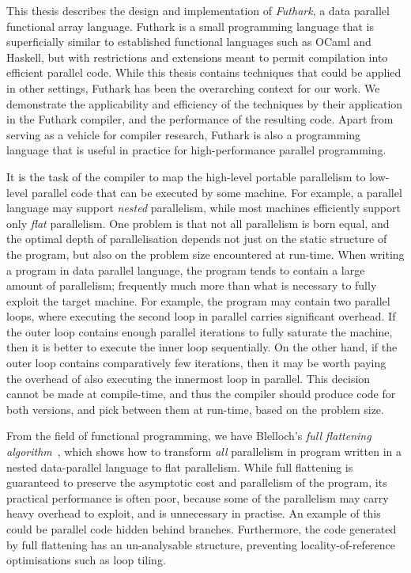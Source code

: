 
This thesis describes the design and implementation of
\textit{Futhark}, a data parallel functional array language.
Futhark is a small programming language that is superficially similar
to established functional languages such as OCaml and Haskell, but
with restrictions and extensions meant to permit compilation into
efficient parallel code.  While this thesis contains techniques that
could be applied in other settings, Futhark has been the overarching
context for our work.  We demonstrate the applicability and efficiency
of the techniques by their application in the Futhark compiler, and
the performance of the resulting code.  Apart from serving as a
vehicle for compiler research, Futhark is also a programming language
that is useful in practice for high-performance parallel programming.

It is the task of the compiler to map the high-level portable
parallelism to low-level parallel code that can be executed by some
machine.  For example, a parallel language may support \textit{nested}
parallelism, while most machines efficiently support only
\textit{flat} parallelism.  One problem is that not all parallelism is
born equal, and the optimal depth of parallelisation depends not just
on the static structure of the program, but also on the problem size
encountered at run-time.  When writing a program in data parallel
language, the program tends to contain a large amount of parallelism;
frequently much more than what is necessary to fully exploit the
target machine.  For example, the program may contain two parallel
loops, where executing the second loop in parallel carries significant
overhead.  If the outer loop contains enough parallel iterations to
fully saturate the machine, then it is better to execute the inner
loop sequentially.  On the other hand, if the outer loop contains
comparatively few iterations, then it may be worth paying the overhead
of also executing the innermost loop in parallel.  This decision
cannot be made at compile-time, and thus the compiler should produce
code for both versions, and pick between them at run-time, based on
the problem size.

From the field of functional programming, we have Blelloch's
\textit{full flattening algorithm}~\cite{blelloch1994implementation},
which shows how to transform \textit{all} parallelism in program
written in a nested data-parallel language to flat parallelism.  While
full flattening is guaranteed to preserve the asymptotic cost and
parallelism of the program, its practical performance is often poor,
because some of the parallelism may carry heavy overhead to exploit,
and is unnecessary in practise.  An example of this could be parallel
code hidden behind branches.  Furthermore, the code generated by full
flattening has an un-analysable structure, preventing
locality-of-reference optimisations such as loop tiling.

